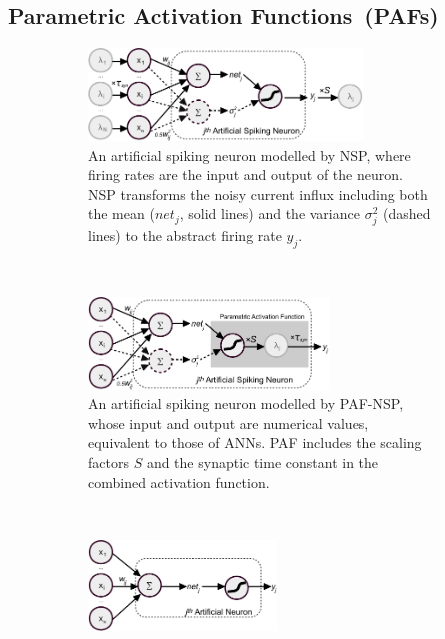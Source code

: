 	\subsection{Parametric Activation Functions~(PAFs)}
	\label{subsec:PAF}
	\begin{figure}[tbh!]
		\centering
		\begin{subfigure}[t]{\textwidth}
			\centering
			\includegraphics[width=0.8\textwidth]{pics_iconip/neuron_o.pdf}
			\caption{An artificial spiking neuron modelled by NSP, where firing rates are the input and output of the neuron. NSP transforms the noisy current influx including both the mean ($net_j$, solid lines) and the variance $\sigma^2_j$ (dashed lines) to the abstract firing rate $y_j$.}
		\end{subfigure}\\\bigskip
		\begin{subfigure}[t]{\textwidth}
			\centering
			\includegraphics[width=0.7\textwidth]{pics_iconip/neuron_PAF.pdf}
			\caption{An artificial spiking neuron modelled by PAF-NSP, whose input and output are numerical values, equivalent to those of ANNs. PAF includes the scaling factors $S$ and the synaptic time constant \DIFdelbeginFL {}\DIFdelendFL \DIFaddbeginFL {}\DIFaddendFL in the combined activation function.}
		\end{subfigure}\\\bigskip
		\begin{subfigure}[t]{\textwidth}
			\centering
			\includegraphics[width=0.55\textwidth]{pics_iconip/neuron.pdf}

\end{subfigure}
\end{figure}

